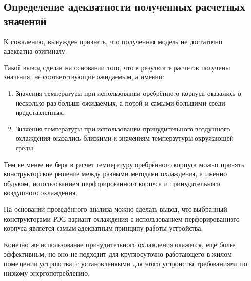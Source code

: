 \subsection{Определение адекватности полученных расчетных значений}

К сожалению, вынужден признать, что полученная модель
не достаточно адекватна оригиналу.

Такой вывод сделан на основании того, что в результате расчетов
получены значения, не соответствующие ожидаемым, а именно:

\begin{enumerate}[label={\arabic*.}]
\item Значения температуры при использовании оребрённого корпуса
оказались в несколько раз больше ожидаемых, а порой и самыми большими
среди представленных.

\item Значения температуры при использовании принудительного
воздушного охлаждения оказались близкими к значениям темпераутуры
окружающей среды.
  
\end{enumerate}

Тем не менее не беря в расчет температуру оребрённого корпуса можно
принять конструкторское решение между разными методами охлаждения, а
именно обдувом, использованием перфорированного корпуса и
принудительного воздушного охлаждения.

На основании проведённого анализа можно сделать вывод, что выбранный
конструкторами РЭС вариант охлаждения с использованием
перфорированного корпуса является самым адекватным
принципу работы устройства.

Конечно же использование принудительного охлаждения окажется,
ещё более эффективным, но оно не подходит для круглосуточно
работающего в жилом помещении устройства, с установленными для 
этого устройства требованиями по низкому энергопотреблению.

\newpage %